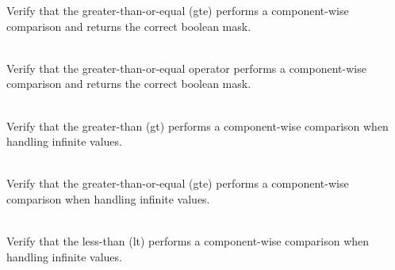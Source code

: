 \begin{DoxyRefList}
\label{test__test000049}%
%
Verify that the  greater-\/than-\/or-\/equal (gte) performs a component-\/wise comparison and returns the correct boolean mask.  
\item[{\parbox[t]{\linewidth}{Member \doxylink{group___f_g_m___vec4___g_t_e___comp_gad1d6e5e86e2a44fbb18ba12995b96cda}{Vector4\+DComparison\+\_\+\+Greater\+Than\+Or\+Equal\+Operator\+\_\+\+Returns\+Boolean\+Vector\+With\+Elements\+Greater\+Than\+Or\+Equal\+As\+True} ()}}]\hfill \\
\label{test__test000050}%
%
Verify that the  greater-\/than-\/or-\/equal operator performs a component-\/wise comparison and returns the correct boolean mask.  
\item[{\parbox[t]{\linewidth}{Member \doxylink{group___f_g_m___vec4___g_t___comp_ga30438033db6402787a233bbd206258a1}{Vector4\+DComparison\+\_\+\+Infinity\+Vector\+\_\+\+Greater\+Than\+\_\+\+Returns\+Boolean\+Vector\+With\+Correct\+Values} ()}}]\hfill \\
\label{test__test000046}%
%
Verify that the  greater-\/than (gt) performs a component-\/wise comparison when handling infinite values.  
\item[{\parbox[t]{\linewidth}{Member \doxylink{group___f_g_m___vec4___g_t_e___comp_ga8e19507625dae566ec1399d7ecdbd9c9}{Vector4\+DComparison\+\_\+\+Infinity\+Vector\+\_\+\+Greater\+Than\+Or\+Equal\+\_\+\+Returns\+Boolean\+Vector\+With\+Correct\+Values} ()}}]\hfill \\
\label{test__test000052}%
%
Verify that the  greater-\/than-\/or-\/equal (gte) performs a component-\/wise comparison when handling infinite values.  
\item[{\parbox[t]{\linewidth}{Member \doxylink{group___f_g_m___vec4___l_t___comp_ga1e5d486f6ee6246651733a3eb0dd5a77}{Vector4\+DComparison\+\_\+\+Infinity\+Vector\+\_\+\+Less\+Than\+\_\+\+Returns\+Boolean\+Vector\+With\+Correct\+Values} ()}}]\hfill \\
\label{test__test000058}%
%
Verify that the  less-\/than (lt) performs a component-\/wise comparison when handling infinite values.  
\item[{\parbox[t]{\linewidth}{Member \doxylink{group___f_g_m___vec4___l_t_e___comp_gaf5e6c50f572c1a1e7450b60046bfe7a4}{Vector4\+DComparison\+\_\+\+Infinity\+Vector\+\_\+\+Less\+Than\+Or\+Equal\+\_\+\+Returns\+Boolean\+Vector\+With\+Correct\+Values} ()}}]\hfill \\

\end{DoxyRefList}

